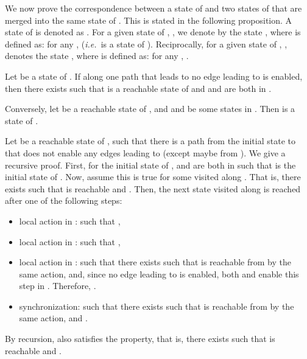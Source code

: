 \documentclass{LMCS}
\theoremstyle{plain}\newtheorem*{prop11}{Proposition~\ref{prop:states} bis}
\def\ie{{\em i.e.\ }}
\begin{document}
We now prove the
correspondence between a state of  and two states of
 that are merged into the same state of .
This is stated in the following proposition.
A state of  is denoted as . For a given state of , , we denote
by  the state , where  is defined as:
for any ,  (\ie  is a state of ).
Reciprocally, for a given
state of , ,
 denotes the state , where  is defined as:
for any  , .
\begin{prop}\label{prop:states}
  Let  be a state of . If along one path that leads to  no edge leading to
   is enabled, then there exists  such that 
  is a reachable state of  and  and  are
  both in .

  Conversely, let  be a reachable state of , and
   and  be some states in .
  Then  is a state of .
\end{prop}


\proof Let  be a reachable state of , such that
  there is a path  from the initial state 
  to  that does not enable any edges leading to 
  (except maybe from ).
  We give a recursive proof. First, for the initial state
   of ,  and
   are both in  such that  is the
  initial state of . Now, assume this is true for some
   visited along . That is, there exists 
  such that  is reachable and .
  Then, the next state  visited along  is reached
  after one of the
  following steps:
  \begin{itemize}
    \item local action in :  such that
    ,
    \item local action in :  such that
    ,
    \item local action in :  such that
    there exists  such that  is reachable from 
    by the same action, and, since no edge leading to  is enabled,
    both  and  enable this step in
    . Therefore, .
    \item synchronization:  such that there exists
     such that  is reachable from 
    by the same action, and .
  \end{itemize}
  By recursion,  also satisfies the property, that is,
  there exists  such that  is reachable and
  .
\end{document}

